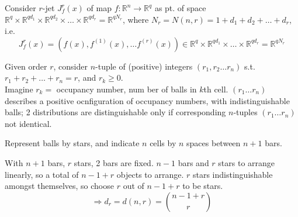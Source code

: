 Consider $r$-jet $J^r_f(x)$ of map $f:\mathbb{R}^n\to \mathbb{R}^q$ as pt. of space $\mathbb{R}^q \times \mathbb{R}^{qd_1} \times \mathbb{R}^{qd_2} \times \dots \times \mathbb{R}^{qd_r} = \mathbb{R}^{q N_r}$, where $N_r = N(n,r) = 1 + d_1 + d_2 + \dots + d_r$, i.e. 
\[
J_f^r(x) = (f(x),f^{(1)}(x) , \dots f^{(r)}(x) ) \in \mathbb{R}^q \times \mathbb{R}^{qd_1} \times  \dots \times \mathbb{R}^{qd_r} = \mathbb{R}^{q N_r}
\]



Given order $r$, consider $n$-tuple of (positive) integers $(r_1,r_2\dots r_n)$ s.t. $r_1 + r_2 + \dots + r_n = r$, and $r_k\geq 0$. \\
 Imagine $r_k = $ occupancy number, num ber of balls in $k$th cell.  $(r_1\dots r_n)$ describes a positive ocnfiguration of occupancy numbers, with indistinguishable balls; 2 distributions are distinguishable only if corresponding $n$-tuples $(r_1 \dots r_n)$ not identical.  

Represent balls by stars, and indicate $n$ cells by $n$ spaces between $n+1$ bars.  

With $n+1$ bars, $r$ stars, 2 bars are fixed. $n-1$ bars and $r$ stars to arrange linearly, so a total of $n-1+r$ objects to arrange.  $r$ stars indistinguishable amongst themselves, so choose $r$ out of $n-1+r$ to be stars.  
\begin{equation}
\Longrightarrow d_r = d(n,r)=\binom{n-1+r}{r}
\end{equation}

